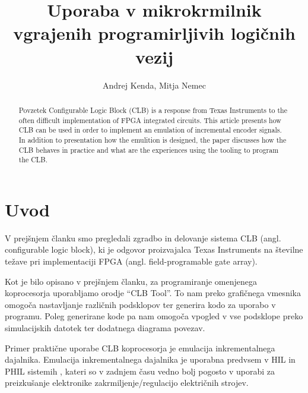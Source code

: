 \documentclass[a4paper]{article}
\begin{document}
\begin{sloppypar}
\title{Uporaba v mikrokrmilnik vgrajenih programirljivih logičnih vezij}

\author{Andrej Kenda, Mitja Nemec}



\maketitle



\begin{abstract}{Povzetek}
Configurable Logic Block (CLB) is a response from Texas Instruments to the
often difficult implementation of FPGA integrated circuits. This article
presents how CLB can be used in order to implement an emulation of incremental
encoder signals. In addition to presentation how the emulition is designed, the
paper discusses how the CLB behaves in practice and what are the experiences
using the tooling to program the CLB.

\end{abstract}



\section{Uvod}
V prejšnjem članku smo pregledali zgradbo in delovanje sistema CLB (angl.
configurable logic block), ki je odgovor proizvajalca Texas Instruments na
številne težave pri implementaciji FPGA (angl. field-programable gate array). 

Kot je bilo opisano v prejšnjem članku, za programiranje omenjenega
koprocesorja uporabljamo orodje ``CLB Tool''. To nam preko grafičnega vmesnika
omogoča nastavljanje različnih podsklopov ter generira kodo za uporabo v
programu. Poleg generirane kode pa nam omogoča vpogled v vse podsklope preko
simulacijskih datotek ter dodatnega diagrama povezav.

Primer praktične uporabe CLB koprocesorja je emulacija inkrementalnega
dajalnika. Emulacija inkrementalnega dajalnika je uporabna predvsem v HIL in
PHIL sistemih \cite{lauss} \cite{nibert}, kateri so v zadnjem času vedno bolj
pogosto v uporabi za preizkušanje elektronike zakrmiljenje/regulacijo
električnih strojev.



\end{sloppypar}
\end{document}
